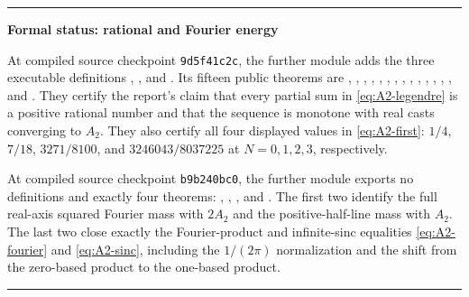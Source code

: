 \documentclass[11pt,oneside]{article}
\numberwithin{equation}{section}
\theoremstyle{definition}
\theoremstyle{remark}
\newenvironment{statusbox}[1]{%
  \par\smallskip\noindent\begin{center}\begin{minipage}{0.94\textwidth}%
  \hrule\vspace{0.55em}\noindent\textbf{#1}\par\smallskip
}{%
  \vspace{0.55em}\hrule\end{minipage}\end{center}\smallskip
}
\begin{document}
\begin{statusbox}{Formal status: rational and Fourier energy}
At compiled source checkpoint \texttt{9d5f41c2c}, the further module
 adds the three executable definitions
,
, and
.  Its fifteen public theorems are
,
,
,
,
,
,
,
,
,
,
,
,
,
, and
.  They certify the report's
claim that every partial sum in \eqref{eq:A2-legendre} is a positive rational
number and that the sequence is monotone with real casts converging to $A_2$.
They also certify all four displayed values in \eqref{eq:A2-first}: $1/4$,
$7/18$, $3271/8100$, and $3246043/8037225$ at $N=0,1,2,3$, respectively.

At compiled source checkpoint \texttt{b9b240bc0}, the further module
 exports no definitions and exactly four
theorems:
,
,
, and
.  The first two
identify the full real-axis squared Fourier mass with $2A_2$ and the
positive-half-line mass with $A_2$.  The last two close exactly the
Fourier-product and infinite-sinc equalities \eqref{eq:A2-fourier} and
\eqref{eq:A2-sinc}, including the $1/(2\pi)$ normalization and the shift from
the zero-based product to the one-based product.
\end{statusbox}
\end{document}
